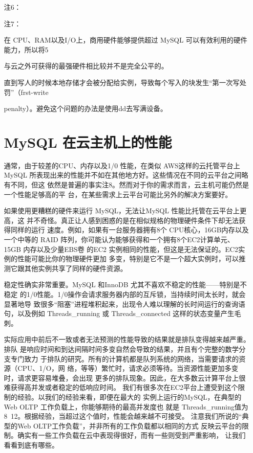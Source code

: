 注6：

注7：

在 CPU、RAM以及I/O上，商用硬件能够提供超过 MySQL 可以有效利用的硬件能力，所以将5

与云之外可获得的最强硬件相比较并不是完全公平的。

直到写人的时候本地存储才会被分配给实例，导致每个写入的块发生“第一次写处罚”（frst-write

penalty）。避免这个问题的办法是使用dd去写满设备。

\section{MySQL 在云主机上的性能}
通常，由于较差的CPU、内存以及1/0 性能，在类似 AWS这样的云托管平台上MySQL
所表现出来的性能并不如在其他地方好。这些情况在不同的云平台之间略有不同，但这
依然是普遍的事实注8。然而对于你的需求而言，云主机可能仍然是一个性能足够高的平
台，在某些需求上云平台可能比另外的解决方案要好。

如果使用更糟糕的硬件来运行 MySQL，无法让MySQL 性能比托管在云平台上更高，这
并不奇怪。真正让人感到困惑的是在相似规格的物理硬件条件下却无法获得同样的运行
速度。例如，如果有一台服务器拥有8个 CPU核心，16GB内存以及一个中等的 RAID
阵列，你可能认为能够获得和一个拥有8个EC2计算单元、15GB 内存以及少量EBS卷
的EC2 实例相同的性能，但这是无法保证的。EC2实例的性能可能比你的物理硬件更加
多变，特别是它不是一个超大实例时，可以推测它跟其他实例共享了同样的硬件资源。

稳定性确实非常重要。MySQL 和InnoDB 尤其不喜欢不稳定的性能——特别是不稳定
的1/0性能。1/0操作会请求服务器内部的互斥锁，当持续时间太长时，就会显著地导
致很多“阻塞”进程堆积起来，出现令人难以理解的长时间运行的查询语句，以及例如
Threads\_running 或 Threads\_connected 这样的状态变量产生毛刺。

实际应用中前后不一致或者无法预测的性能导致的结果就是排队变得越来越严重。排队
是响应时间和到达间隔时间多变自然会导致的结果，并且有个完整的数学分支专门致力
于排队的研究。所有的计算机都是队列系统的网络，当需要请求的资源（CPU、1/O，网
络，等等）繁忙时，请求必须等待。当资源性能更加多变时，请求更容易堆叠，会出现
更多的排队现象。因此，在大多数云计算平台上很难获得高并发或者稳定的低响应时间。
我们有很多次在EC2平台上遭受到这个限制的经验。以我们的经验来看，即便在最大的
实例上运行的MySQL，在典型的 Web OLTP 工作负载上，你能够期待的最高并发度也
就是 Threads\_running值为8~12。根据经验，当超过这个值时，性能会越来越不可接受。
注意我们所说的“典型的Web OLTP工作负载”，并非所有的工作负载都以相同的方式
反映云平台的限制。确实有一些工作负载在云中表现得很好，而有一些则受到严重影响，
让我们看看到底有哪些。

